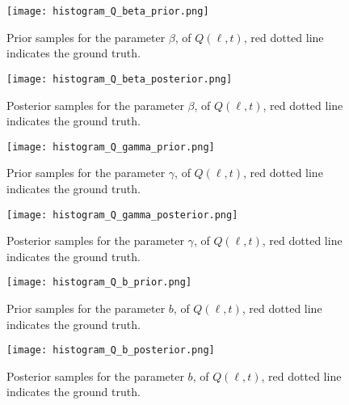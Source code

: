 \begin{figure*}[!htb]
  \centering
  \begin{subfigure}[b]{0.75\textwidth}
    \centering
    \texttt{[image: histogram\_Q\_beta\_prior.png]}
    \caption{ 
      Prior samples for the parameter $\beta$, of $Q(\ell, t)$, 
      red dotted line indicates the ground truth.
    }
    \label{fig:betaprior}
  \end{subfigure}
  \hfill
  \begin{subfigure}[b]{0.75\textwidth}
    \centering
    \texttt{[image: histogram\_Q\_beta\_posterior.png]}
    \caption{
      Posterior samples for the parameter $\beta$, of $Q(\ell, t)$, 
      red dotted line indicates the ground truth.
    }
    \label{fig:beta}
  \end{subfigure}
\end{figure*}


\begin{figure*}[!htb]
  \centering
  \begin{subfigure}[b]{0.75\textwidth}
    \centering
    \texttt{[image: histogram\_Q\_gamma\_prior.png]}
    \caption{ 
      Prior samples for the parameter $\gamma$, of $Q(\ell, t)$, 
      red dotted line indicates the ground truth.
    }
    \label{fig:gammaprior}
  \end{subfigure}
  \hfill
  \begin{subfigure}[b]{0.75\textwidth}
    \centering
    \texttt{[image: histogram\_Q\_gamma\_posterior.png]}
    \caption{
      Posterior samples for the parameter $\gamma$, of $Q(\ell, t)$, 
      red dotted line indicates the ground truth.}
    \label{fig:gamma}
  \end{subfigure}
\end{figure*}


\begin{figure*}[!htb]
  \centering
  \begin{subfigure}[b]{0.75\textwidth}
    \centering
    \texttt{[image: histogram\_Q\_b\_prior.png]}
    \caption{ 
      Prior samples for the parameter $b$, of $Q(\ell, t)$, 
      red dotted line indicates the ground truth.
    }
    \label{fig:bprior}
  \end{subfigure}
  \hfill
  \begin{subfigure}[b]{0.75\textwidth}
    \centering
    \texttt{[image: histogram\_Q\_b\_posterior.png]}
    \caption{
      Posterior samples for the parameter $b$, of $Q(\ell, t)$, 
      red dotted line indicates the ground truth.}
    \label{fig:b}
  \end{subfigure}
\end{figure*}

%
%
